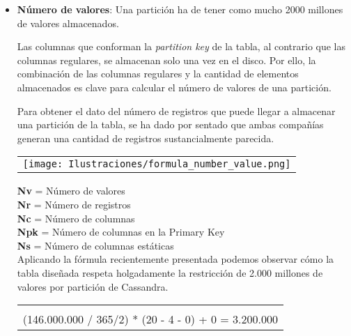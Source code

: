 \begin{itemize}
	
	\item \textbf{Número de valores}: Una partición ha de tener como mucho 2000 millones de valores almacenados.
	
	Las columnas que conforman la \textit{partition key} de la tabla, al contrario que las columnas regulares, se almacenan solo una vez en el disco. Por ello, la combinación de las columnas regulares y la cantidad de elementos almacenados es clave para calcular el número de valores de una partición. 
	
	Para obtener el dato del número de registros que puede llegar a almacenar una partición de la tabla, se ha dado por sentado que ambas compañías generan una cantidad de registros sustancialmente parecida.
	
	\begin{table}[h!]
		\centering
		\begin{tabular}{l}
			
			\\
		
			\texttt{[image: Ilustraciones/formula\_number\_value.png]}
			
			\\
			
		\end{tabular}
	\end{table}
	
	\clearpage
	
	\textbf{Nv} = Número de  valores\\
	\textbf{Nr} = Número de registros\\
	\textbf{Nc} = Número de columnas\\
	\textbf{Npk} = Número de columnas en la Primary Key\\
	\textbf{Ns} = Número de columnas estáticas\\
	
	Aplicando la fórmula recientemente presentada podemos observar cómo la tabla diseñada respeta holgadamente la restricción de 2.000 millones de valores por partición de Cassandra. 
	
	\begin{table}[h!]
		\centering
		\begin{tabular}{|l|}
			
			\hline
			\\
			
			(146.000.000 / 365/2) * (20 - 4 - 0) + 0 = 3.200.000\\
			

\end{tabular}
\end{table}
\end{itemize}
